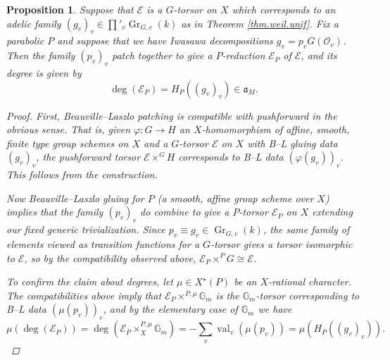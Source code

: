 \documentclass[openany]{amsbook}
\newtheorem{proposition}[theorem]{Proposition}
\theoremstyle{definition}
\theoremstyle{remark}
\numberwithin{equation}{section}
\newcommand{\G}{\mathbb{G}}
\renewcommand{\O}{\mathcal{O}}
\newcommand{\cE}{\mathcal{E}}
\newcommand{\val}{\on{val}}
\renewcommand{\phi}{\varphi}
\renewcommand{\-}{\operatorname{-}}
\renewcommand{\a}{\mathfrak{a}}
\newcommand{\on}[1]{\operatorname{#1}}
\newcommand{\Gr}{\on{Gr}}
\begin{document}
\begin{proposition}\label{prop.deg.p.red.BL}
    Suppose that $\cE$ is a $G$-torsor on $X$ which corresponds to an adelic family $(g_v)_v \in \prod'_v \Gr_{G,v}(k)$ as in Theorem \ref{thm.weil.unif}. Fix a parabolic $P$ and suppose that we have Iwasawa decompositions $g_v = p_v G(\O_v)$. Then the family $(p_v)_v$ patch together to give a $P$-reduction $\cE_P$ of $\cE$, and its degree is given by
    \[
        \deg(\cE_P) = H_P((g_v)_v) \in \a_M.
    \]
    \begin{proof}
        First, Beauville--Laszlo patching is compatible with pushforward in the obvious sense. That is, given $\phi : G \to H$ an $X$-homomorphism of affine, smooth, finite type group schemes on $X$ and a $G$-torsor $\cE$ on $X$ with B--L gluing data $(g_v)_v$, the pushforward torsor $\cE \times^G H$ corresponds to B--L data $(\phi(g_v))_v$. This follows from the construction. 
        
        Now Beauville--Laszlo gluing for $P$ (a smooth, affine group scheme over $X$) implies that the family $(p_v)_v$ do combine to give a $P$-torsor $\cE_P$ on $X$ extending our fixed generic trivialization. Since $p_v \equiv g_v \in \Gr_{G,v}(k)$, the same family of elements viewed as transition functions for a $G$-torsor gives a torsor isomorphic to $\cE$, so by the compatibility observed above, $\cE_P \times^P G \cong \cE$. 

        To confirm the claim about degrees, let $\mu \in X^\star(P)$ be an $X$-rational character. The compatibilities above imply that $\cE_P \times^{P, \mu} \G_m$ is the $\G_m$-torsor corresponding to B--L data $(\mu(p_v))_v$, and by the elementary case of $\G_m$ we have
        $$
            \mu(\deg(\cE_P)) = \deg(\cE_P \times^{P, \mu}_X \G_m) = -\sum_{v} \val_v(\mu(p_v)) = \mu(H_P((g_v)_v)).
        $$
    \end{proof}
\end{proposition}
\end{document}
